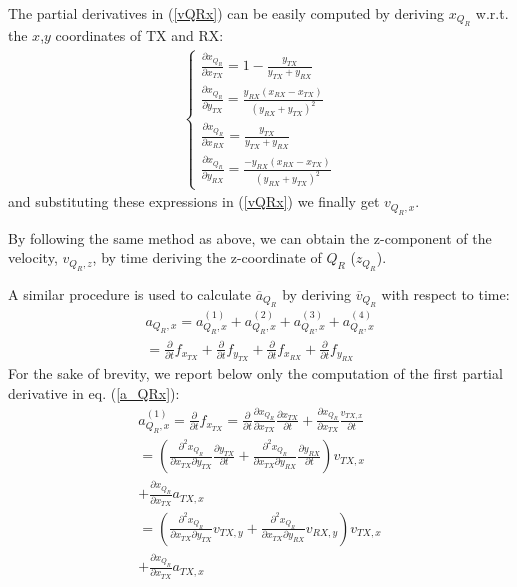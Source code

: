The partial derivatives in (\ref{vQRx}) can be easily computed by deriving $x_{Q_R}$ w.r.t. the $x$,$y$ coordinates of TX and RX: 
\begin{equation*}
	\begin{gathered}
	\begin{cases*}
	\frac{\partial x_{Q_R}}{\partial x_{TX}} = 1 - \frac{y_{TX}}{y_{TX}+y_{RX}}\\ 
	\frac{\partial x_{Q_R}}{\partial y_{TX}} = \frac{y_{RX} (x_{RX}-x_{TX})}{(y_{RX}+y_{TX})^2}\\
	\frac{\partial x_{Q_R}}{\partial x_{RX}} = \frac{y_{TX}}{y_{TX}+y_{RX}} \\ 
	\frac{\partial x_{Q_R}}{\partial y_{RX}} = \frac{-y_{RX} (x_{RX}-x_{TX})}{(y_{RX}+y_{TX})^2}
	\end{cases*}
	\end{gathered} 
\end{equation*}
and substituting these expressions in (\ref{vQRx}) we finally get $v_{Q_R,x}$. \par
By following the same method as above, we can obtain the z-component of the velocity, $v_{Q_R,z}$, by time deriving the z-coordinate of $Q_R$ ($z_{Q_R}$). \par 
A similar procedure is used to calculate $\overline{a}_{Q_{R}}$ by deriving $\overline{v}_{Q_{R}}$ with respect to time:
\begin{equation}
	\begin{gathered}
	a_{Q_R,x}=a_{Q_R,x}^{(1)}+a_{Q_R,x}^{(2)}+a_{Q_R,x}^{(3)}+a_{Q_R,x}^{(4)} \\
	= \frac{\partial}{\partial t} f_{x_{TX}}+\frac{\partial}{\partial t} f_{y_{TX}}+\frac{\partial}{\partial t} f_{x_{RX}}+\frac{\partial}{\partial t} f_{y_{RX}}
	\end{gathered}
	\label{a_QRx}
\end{equation}
For the sake of brevity, we report below only the computation of the first partial derivative in eq. (\ref{a_QRx}): 
\begin{equation}
	\begin{gathered}
	a_{Q_R,x}^{(1)} = \frac{\partial}{\partial t} f_{x_{TX}} = \frac{\partial}{\partial t} \frac{\partial x_{Q_R}}{\partial x_{TX}} \frac{\partial x_{TX}}{\partial t} + \frac{\partial x_{Q_R}}{\partial x_{TX}} \frac{v_{TX,x}}{\partial t} \\ 
	= \left(\frac{\partial^2 x_{Q_R}}{\partial x_{TX} \partial y_{TX}} \frac{\partial y_{TX}}{\partial t} + \frac{\partial^2 x_{Q_R}}{\partial x_{TX} \partial y_{RX}} \frac{\partial y_{RX}}{\partial t} \right) v_{TX,x} \\
	+ \frac{\partial x_{Q_R}}{\partial x_{TX}} a_{TX,x}\\ 
	= \left(\frac{\partial^2 x_{Q_R}}{\partial x_{TX} \partial y_{TX}} v_{TX,y}  + \frac{\partial^2 x_{Q_R}}{\partial x_{TX} \partial y_{RX}} v_{RX,y} \right) v_{TX,x} \\ 
	+ \frac{\partial x_{Q_R}}{\partial x_{TX}} a_{TX,x}
	\end{gathered}
	\label{aQRx1}
\end{equation}
